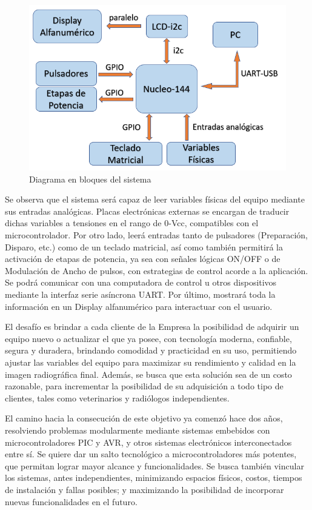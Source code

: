 \documentclass[
11pt, %
]{charter}
\begin{document}
\begin{figure}[htpb]
\centering 
\includegraphics[width=.6\textwidth]{./Figuras/diagBloques.png}
\caption{Diagrama en bloques del sistema}
\label{fig:diagBloques}
\end{figure}
\vspace{25px}

Se observa que el sistema será capaz de leer variables físicas del equipo mediante sus entradas analógicas. Placas electrónicas externas se encargan de traducir dichas variables a tensiones en el rango de 0-Vcc, compatibles con el microcontrolador. Por otro lado, leerá entradas tanto de pulsadores (Preparación, Disparo, etc.) como de un teclado matricial, así como también permitirá la activación de etapas de potencia, ya sea con señales lógicas ON/OFF o de Modulación de Ancho de pulsos, con estrategias de control acorde a la aplicación. Se podrá comunicar con una computadora de control  u otros dispositivos mediante la interfaz serie asíncrona UART. Por último, mostrará toda la información en un Display alfanumérico para interactuar con el usuario.

El desafío es brindar a cada cliente de la Empresa la posibilidad de adquirir un equipo nuevo o actualizar el que ya posee, con tecnología moderna, confiable, segura y duradera, brindando comodidad y practicidad en su uso, permitiendo ajustar las variables del equipo para maximizar su rendimiento y calidad en la imagen radiográfica final. Además, se busca que esta solución sea de un costo razonable,  para incrementar la posibilidad de su adquisición a todo tipo de clientes, tales como veterinarios y radiólogos independientes. 

El camino hacia la consecución de este objetivo ya comenzó hace dos años, resolviendo problemas modularmente mediante sistemas embebidos con microcontroladores PIC y AVR, y otros sistemas electrónicos interconectados entre sí. Se quiere dar un salto tecnológico a microcontroladores más potentes, que permitan lograr mayor alcance y funcionalidades. Se busca también vincular los sistemas, antes independientes, minimizando espacios físicos, costos, tiempos de instalación y fallas posibles; y maximizando la posibilidad de incorporar nuevas funcionalidades en el futuro.
 
\end{document}

